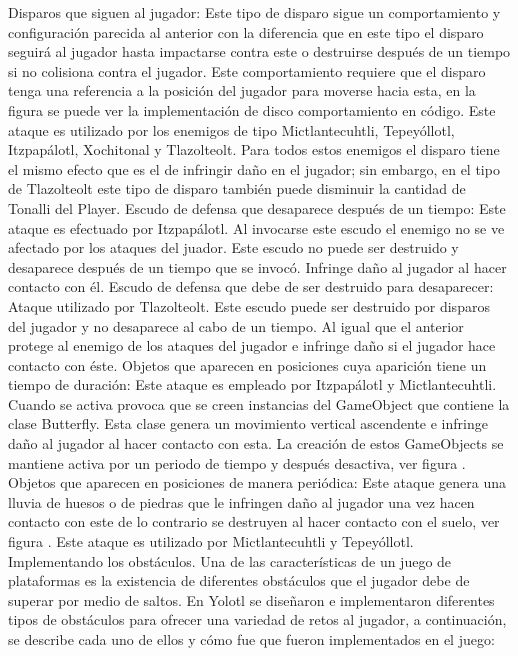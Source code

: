 Disparos que siguen al jugador: Este tipo de disparo sigue un comportamiento y configuración parecida al anterior con la diferencia que en este tipo el disparo seguirá al jugador hasta impactarse contra este o destruirse después de un tiempo si no colisiona contra el jugador.  Este comportamiento requiere que el disparo tenga una referencia a la posición del jugador para moverse hacia esta, en la figura se puede ver la implementación de disco comportamiento en código. Este ataque es utilizado por los enemigos de tipo Mictlantecuhtli, Tepeyóllotl, Itzpapálotl, Xochitonal y Tlazolteolt. Para todos estos enemigos el disparo tiene el mismo efecto que es el de infringir daño en el jugador; sin embargo, en el tipo de Tlazolteolt este tipo de disparo también puede disminuir la cantidad de Tonalli del Player.
Escudo de defensa que desaparece después de un tiempo: Este ataque es efectuado por Itzpapálotl. Al invocarse este escudo el enemigo no se ve afectado por los ataques del juador. Este escudo no puede ser destruido y desaparece después de un tiempo que se invocó. Infringe daño al jugador al hacer contacto con él.
Escudo de defensa que debe de ser destruido para desaparecer: Ataque utilizado por Tlazolteolt. Este escudo puede ser destruido por disparos del jugador y no desaparece al cabo de un tiempo. Al igual que el anterior protege al enemigo de los ataques del jugador e infringe daño si el jugador hace contacto con éste.  
Objetos que aparecen en posiciones cuya aparición tiene un tiempo de duración: Este ataque es empleado por Itzpapálotl y Mictlantecuhtli. Cuando se activa provoca que se creen instancias del GameObject que contiene la clase Butterfly. Esta clase genera un movimiento vertical ascendente e infringe daño al jugador al hacer contacto con esta. La creación de estos GameObjects se mantiene activa por un periodo de tiempo y después desactiva, ver figura .  
Objetos que aparecen en posiciones de manera periódica: Este ataque genera una lluvia de huesos o de piedras que le infringen daño al jugador una vez hacen contacto con este de lo contrario se destruyen al hacer contacto con el suelo, ver figura . Este ataque es utilizado por Mictlantecuhtli y Tepeyóllotl. 
Implementando los obstáculos.
Una de las características de un juego de plataformas es la existencia de diferentes obstáculos que el jugador debe de superar por medio de saltos. En Yolotl se diseñaron e implementaron diferentes tipos de obstáculos para ofrecer una variedad de retos al jugador, a continuación, se describe cada uno de ellos y cómo fue que fueron implementados en el juego:
